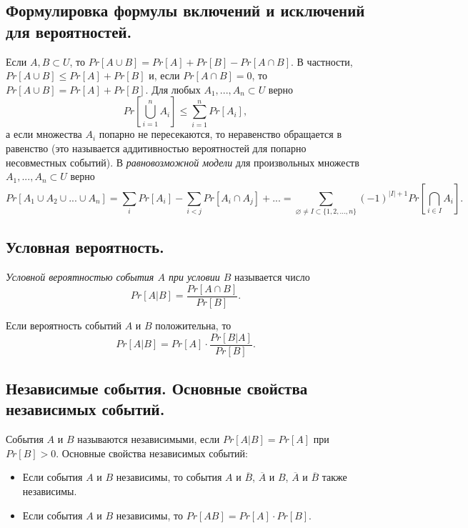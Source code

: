 \subsection{Формулировка формулы включений и исключений для вероятностей.}
Если $A, B \subset U$, то 
\(
Pr[A \cup B] = Pr[A] + Pr[B] - Pr[A \cap B].
\)
В частности, \(
Pr[A \cup B] \leqslant Pr[A] + Pr[B]
\) и, если $Pr[A \cap B] = 0$, то \(
Pr[A \cup B]=Pr[A]+Pr[B].
\)
\newline
\newline
Для любых $A_1, ... , A_n \subset U$ верно
\[
Pr [
\bigcup_{i=1}^n A_i
] \leqslant
\sum_{i=1}^n Pr[A_i],
\]
а если множества $A_i$ попарно не пересекаются, то неравенство обращается в равенство (это называется аддитивностью вероятностей для попарно несовместных событий).
\newline
\newline
В \textit{равновозможной модели} для произвольных множеств $A_1,...,A_n \subset U$ верно
\[
Pr[A_1 \cup A_2 \cup ... \cup A_n] = \sum_i Pr[A_i] - \sum_{i<j} Pr[A_i \cap A_j] + ... = \sum_{\varnothing \neq I \subset \{1,2,...,n\}} (-1)^{|I| + 1} Pr \left[ \bigcap_{i \in I} A_i \right].
\]


\subsection{Условная вероятность.}
\textit{Условной вероятностью события $A$ при условии $B$} называется число
\[
Pr[A | B] = \frac{Pr[A \cap B]}{Pr[B]}.
\]
\begin{lemma}
 Если вероятность событий $A$ и $B$ положительна, то
\[
Pr[A | B] = Pr[A] \cdot \frac{Pr[B | A]}{Pr[B]}.
\]
\end{lemma}


\subsection{Независимые события. Основные свойства независимых событий.}
События $A$ и $B$ называются независимыми, если $Pr[A | B] = Pr[A]$ при $Pr[B] > 0$. 
\newline
Основные свойства независимых событий:
\begin{itemize}
    \item Если события $A$ и $B$ независимы, то события $A$ и $\overline{B}$, $\overline{A}$ и $B$, $\overline{A}$ и $\overline{B}$ также независимы.
    \item Если события $A$ и $B$ независимы, то $Pr[AB] = Pr[A] \cdot Pr[B]$.
\end{itemize}


